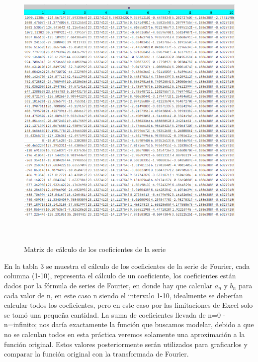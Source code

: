 \begin{figure}[H]
    \centering
    \includegraphics[width=5.5in,height=5.52745in]{media/image21.png}
    \caption{Matriz de cálculo de los coeficientes de la serie}
\end{figure}

En la tabla 3 se muestra el cálculo de los coeficientes de la serie de Fourier, cada columna (1-10), representa el cálculo de un coeficiente, los coeficientes están dados por la fórmula de series de Fourier, en donde hay que calcular \(a_n\) y \(b_n\) para cada valor de n, en este caso n siendo el intervalo 1-10, idealmente se deberían calcular todos los coeficientes, pero en este caso por las limitaciones de Excel solo se tomó una pequeña cantidad. La suma de coeficientes llevada de n=0 - n=infinito; nos daría exactamente la función que buscamos modelar, debido a que no se calculan todos en esta práctica veremos solamente una aproximación a la función original. Estos valores posteriormente serán utilizados para graficarlos y comparar la función original con la transformada de Fourier.

